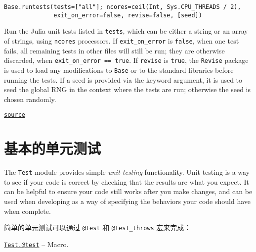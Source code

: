 \begin{adjustwidth}{2em}{0pt}


\begin{verbatim}
Base.runtests(tests=["all"]; ncores=ceil(Int, Sys.CPU_THREADS / 2),
              exit_on_error=false, revise=false, [seed])
\end{verbatim}

Run the Julia unit tests listed in \texttt{tests}, which can be either a string or an array of strings, using \texttt{ncores} processors. If \texttt{exit\_on\_error} is \texttt{false}, when one test fails, all remaining tests in other files will still be run; they are otherwise discarded, when \texttt{exit\_on\_error == true}. If \texttt{revise} is \texttt{true}, the \texttt{Revise} package is used to load any modifications to \texttt{Base} or to the standard libraries before running the tests. If a seed is provided via the keyword argument, it is used to seed the global RNG in the context where the tests are run; otherwise the seed is chosen randomly.



\href{https://github.com/JuliaLang/julia/blob/9058264a69f9efc1af805c4473c946f87859b731/base/util.jl#L549-L561}{\texttt{source}}


\end{adjustwidth}

\hypertarget{7988833292242463234}{}


\section{基本的单元测试}



The \texttt{Test} module provides simple \emph{unit testing} functionality. Unit testing is a way to see if your code is correct by checking that the results are what you expect. It can be helpful to ensure your code still works after you make changes, and can be used when developing as a way of specifying the behaviors your code should have when complete.



简单的单元测试可以通过 \texttt{@test} 和 \texttt{@test\_throws} 宏来完成：


\hypertarget{1038355522981819767}{}
\hyperlink{1038355522981819767}{\texttt{Test.@test}}  -- {Macro.}

